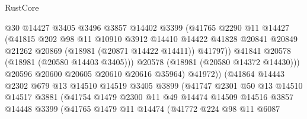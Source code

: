 \begin{lexlean}{RustCore}
\begin{coremodule}
                              @30
                              @14427
                              @3405
                              @3496
                              @3857
                              @14402
                              @3399
                              (@41765
                                @2290
                                @11
                                @14427
                                (@41815
                                  @202
                                  @98
                                  @11
                                  @10910
                                  @3912
                                  @14410
                                  @14422
                                  @41828
                                  @20841
                                  @20849
                                  @21262
                                  @20869
                                  (@18981 (@20871 @14422 @14411))
                                  @41797))
                              @41841
                              @20578
                              (@18981 (@20580 @14403 @3405)))
                            @20578
                            (@18981 (@20580 @14372 @14430)))
                          @20596
                          @20600
                          @20605
                          @20610
                          @20616
                          @35964)
                        @41972))
                    (@41864
                      @14443
                      @2302
                      @679
                      @13
                      @14510
                      @14519
                      @3405
                      @3899
                      (@41747
                        @2301
                        @50
                        @13
                        @14510
                        @14517
                        @3881
                        (@41754
                          @1479
                          @2300
                          @11
                          @49
                          @14474
                          @14509
                          @14516
                          @3857
                          @14448
                          @3399
                          (@41765
                            @1479
                            @11
                            @14474
                            (@41772
                              @224
                              @98
                              @11
                              @6087

\end{coremodule}
\end{lexlean}
